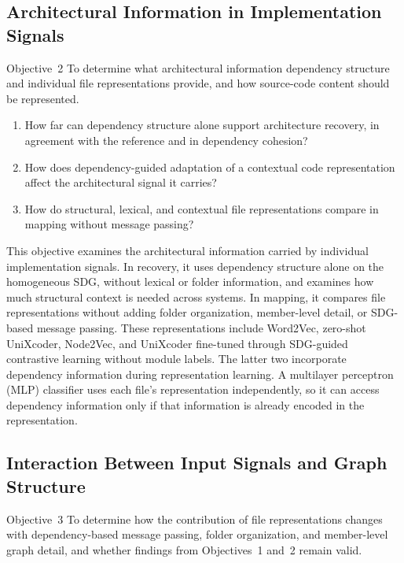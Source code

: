 \subsection{Architectural Information in Implementation Signals}
\label{sec:obj_2}

\begin{GrayBox}{Objective~2}
To determine what architectural information dependency structure and individual file representations provide, and how source-code content should be represented.
\end{GrayBox}
\begin{enumerate}[label=RQ2.\arabic*, leftmargin=3em, itemsep=-0.05pt]
    \item How far can dependency structure alone support architecture recovery, in agreement with the reference and in dependency cohesion?
    \item How does dependency-guided adaptation of a contextual code representation affect the architectural signal it carries?
    \item How do structural, lexical, and contextual file representations compare in mapping without message passing?
\end{enumerate}
This objective examines the architectural information carried by individual implementation signals. In recovery, it uses dependency structure alone on the homogeneous SDG, without lexical or folder information, and examines how much structural context is needed across systems. In mapping, it compares file representations without adding folder organization, member-level detail, or SDG-based message passing. These representations include Word2Vec, zero-shot UniXcoder, Node2Vec, and UniXcoder fine-tuned through SDG-guided contrastive learning without module labels. The latter two incorporate dependency information during representation learning. A multilayer perceptron (MLP) classifier uses each file's representation independently, so it can access dependency information only if that information is already encoded in the representation.
\subsection{Interaction Between Input Signals and Graph Structure}
\label{sec:obj_3}

\begin{GrayBox}{Objective~3}
To determine how the contribution of file representations changes with dependency-based message passing, folder organization, and member-level graph detail, and whether findings from Objectives~1 and~2 remain valid.
\end{GrayBox}

